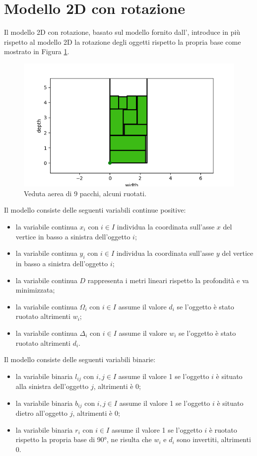 \section{Modello 2D con rotazione}
Il modello 2D con rotazione, basato sul modello fornito dall', introduce in più rispetto al modello 2D la rotazione degli oggetti rispetto la propria base come mostrato in Figura \ref{fig:pacchi_ruotati}.
\begin{figure}[H]
	\begin{center} \includegraphics[scale=0.6]{figures/2dr}
		\caption[Pacchi ruotati]{Veduta aerea di 9 pacchi, alcuni ruotati.}
		\label{fig:pacchi_ruotati}
	\end{center}
\end{figure}

\noindent Il modello consiste delle seguenti variabili continue positive:
\begin{itemize}
	\item la variabile continua $x_{i}$ con $i \in I$ individua la coordinata sull'asse $x$ del vertice in basso a sinistra dell'oggetto $i$;
	\item la variabile continua $y_{i}$ con $i \in I$ individua la coordinata sull'asse $y$ del vertice in basso a sinistra dell'oggetto $i$;
	\item la variabile continua $D$ rappresenta i metri lineari rispetto la profondità e va minimizzata;
	\item la variabile continua $\Omega_{i}$ con $i \in I$ assume il valore $d_i$ se l'oggetto è stato ruotato altrimenti $w_i$;
	\item la variabile continua $\Delta_{i}$ con $i \in I$ assume il valore $w_i$ se l'oggetto è stato ruotato altrimenti $d_i$.
\end{itemize}
Il modello consiste delle seguenti variabili binarie:
\begin{itemize}
	\item la variabile binaria $l_{ij}$ con $i,j \in I$ assume il valore 1 se l'oggetto $i$ è situato alla sinistra dell'oggetto $j$, altrimenti è 0;
	\item la variabile binaria $b_{ij}$ con $i,j \in I$ assume il valore 1 se l'oggetto $i$ è situato dietro all'oggetto $j$, altrimenti è 0;
	\item la variabile binaria $r_{i}$ con $i \in I$ assume il valore 1 se l'oggetto $i$ è ruotato rispetto la propria base di 90°, ne risulta che $w_{i}$ e $d_{i}$ sono invertiti, altrimenti 0.
\end{itemize}

